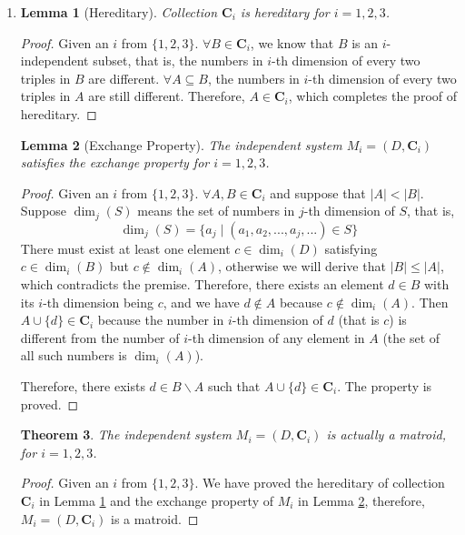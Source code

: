 \documentclass[12pt,a4paper]{article}
\makeatletter
\newtheorem{theorem}{Theorem}
\newtheorem{lemma}[theorem]{Lemma}
\newtheorem*{solution}{Solution}
\theoremstyle{definition}
\renewenvironment{solution}[1][Solution] {\par\pushQED{\qed}\normalfont\topsep6\p@\@plus6\p@\relax\trivlist\item[\hskip\labelsep\bfseries#1\@addpunct{.}]\ignorespaces}{\popQED\endtrivlist\@endpefalse} \makeatother
\makeatother
\begin{document}
\begin{enumerate}
\begin{solution}
\begin{enumerate}
        \begin{lemma}[Hereditary]\label{lemma6}
        Collection $\mathbf{C}_i$ is hereditary for $i = 1,2,3$.
        \end{lemma}
        \begin{proof}
        Given an $i$ from $\{1, 2, 3\}$.  $\forall B \in \mathbf{C}_i$, we know that $B$ is an $i$-independent subset, that is, the numbers in $i$-th dimension of every two triples in $B$ are different. $\forall A \subseteq B$, the numbers in $i$-th dimension of every two triples in $A$ are still different. Therefore, $A \in \mathbf{C}_i$, which completes the proof of hereditary.
        \end{proof}

        \begin{lemma}[Exchange Property]\label{lemma7}
        The independent system $M_i = (D, \mathbf{C}_i)$ satisfies the exchange property for $i = 1,2,3$.
        \end{lemma}
        \begin{proof}
        Given an $i$ from $\{1, 2, 3\}$. $\forall A, B \in \mathbf{C}_i$ and suppose that $|A| < |B|$. Suppose $\dim_j(S)$ means the set of numbers in $j$-th dimension of $S$, that is,
        \begin{displaymath}
        \dim_j (S) = \{a_j \mid (a_1, a_2, ..., a_j, ...) \in S\}
        \end{displaymath}
        There must exist at least one element $c \in \dim_i (D)$ satisfying $c \in \dim_i(B)$ but $c \notin \dim_i(A)$, otherwise we will derive that $|B| \leq |A|$, which contradicts the premise. Therefore, there exists an element $d \in B$ with its $i$-th dimension being $c$, and we have $d \notin A$ because $c \notin \dim_i(A)$. Then $A \cup \{d\} \in \mathbf{C}_i$ because the number in $i$-th dimension of $d$ (that is $c$) is different from the number of $i$-th dimension of any element in $A$ (the set of all such numbers is $\dim_i(A)$).

        Therefore, there exists $d \in B \backslash A$ such that $A \cup \{d\} \in \mathbf{C}_i$. The property is proved.
        \end{proof}
        \begin{theorem}\label{theorem8}
        The independent system $M_i = (D, \mathbf{C}_i)$ is actually a matroid, for $i = 1, 2, 3$.
        \end{theorem}
        \begin{proof}
        Given an $i$ from $\{1, 2, 3\}$. We have proved the hereditary of collection $\mathbf{C}_i$ in Lemma \ref{lemma6} and the exchange property of $M_i$ in Lemma \ref{lemma7}, therefore, $M_i = (D, \mathbf{C}_i)$ is a matroid.
        \end{proof}


\end{enumerate}
\end{solution}
\end{enumerate}
\end{document}
